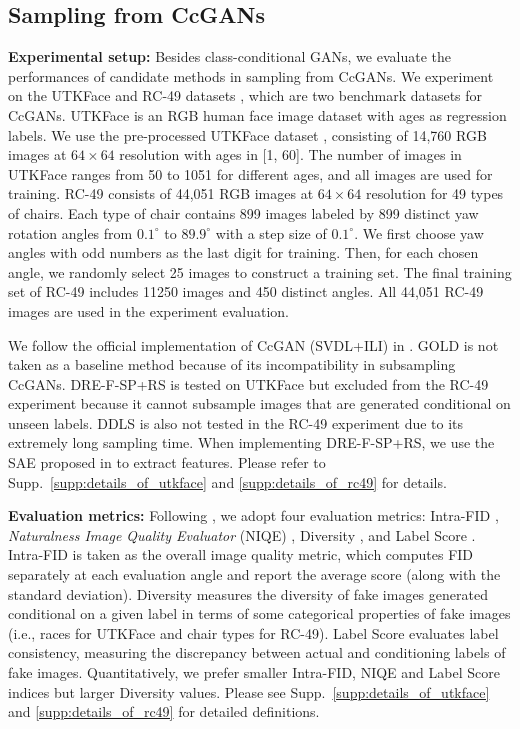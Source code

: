 \documentclass[final,12pt, 3p,times]{elsarticle}
\begin{document}
\subsection{Sampling from CcGANs}\label{sec:experiment_regression}

{\setlength{\parindent}{0cm} \textbf{Experimental setup:}} Besides class-conditional GANs, we evaluate the performances of candidate methods in sampling from CcGANs. We experiment on the UTKFace \cite{utkface} and RC-49 datasets \cite{ding2021ccgan, ding2020continuous}, which are two benchmark datasets for CcGANs. UTKFace is an RGB human face image dataset with ages as regression labels. We use the pre-processed UTKFace dataset \cite{ding2021ccgan}, consisting of 14,760 RGB images at $64\times 64$ resolution with ages in [1, 60]. The number of images in UTKFace ranges from 50 to 1051 for different ages, and all images are used for training. RC-49 consists of 44,051 RGB images at $64\times 64$ resolution for 49 types of chairs. Each type of chair contains 899 images labeled by 899 distinct yaw rotation angles from $0.1^{\circ}$ to $89.9^{\circ}$ with a step size of $0.1^{\circ}$. We first choose yaw angles with odd numbers as the last digit for training. Then, for each chosen angle, we randomly select 25 images to construct a training set. The final training set of RC-49 includes 11250 images and 450 distinct angles.  All 44,051 RC-49 images are used in the experiment evaluation.

We follow the official implementation of CcGAN (SVDL+ILI) in \cite{ding2021ccgan, ding2020continuous}. GOLD is not taken as a baseline method because of its incompatibility in subsampling CcGANs. DRE-F-SP+RS is tested on UTKFace but excluded from the RC-49 experiment because it cannot subsample images that are generated conditional on unseen labels. DDLS is also not tested in the RC-49 experiment due to its extremely long sampling time. When implementing DRE-F-SP+RS, we use the SAE proposed in  to extract features. Please refer to Supp.\ \ref{supp:details_of_utkface} and \ref{supp:details_of_rc49} for details. 


{\setlength{\parindent}{0cm} \textbf{Evaluation metrics:}}
Following \cite{ding2021ccgan, ding2020continuous}, we adopt four evaluation metrics: Intra-FID \cite{miyato2018cgans}, \textit{Naturalness Image Quality Evaluator} (NIQE) \cite{mittal2012making}, Diversity \cite{ding2021ccgan, ding2020continuous}, and Label Score \cite{ding2021ccgan, ding2020continuous}. Intra-FID is taken as the overall image quality metric, which computes FID separately at each evaluation angle and report the average score (along with the standard deviation). Diversity measures the diversity of fake images generated conditional on a given label in terms of some categorical properties of fake images (i.e., races for UTKFace and chair types for RC-49). Label Score evaluates label consistency, measuring the discrepancy between actual and conditioning labels of fake images. Quantitatively, we prefer smaller Intra-FID, NIQE and Label Score indices but larger Diversity values. Please see Supp.\ \ref{supp:details_of_utkface} and \ref{supp:details_of_rc49} for detailed definitions. 
\end{document}
